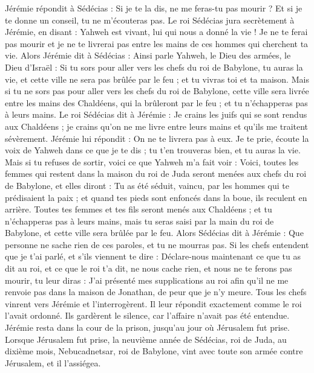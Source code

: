 \begin{multicols}{2}
Jérémie répondit à Sédécias : Si je te la dis, ne me feras-tu pas mourir ? Et si je te donne un conseil, tu ne m'écouteras pas.
Le roi Sédécias jura secrètement à Jérémie, en disant : Yahweh est vivant, lui qui nous a donné la vie ! Je ne te ferai pas mourir et je ne te livrerai pas entre les mains de ces hommes qui cherchent ta vie.
Alors Jérémie dit à Sédécias : Ainsi parle Yahweh, le Dieu des armées, le Dieu d'Israël : Si tu sors pour aller vers les chefs du roi de Babylone, tu auras la vie, et cette ville ne sera pas brûlée par le feu ; et tu vivras toi et ta maison.
Mais si tu ne sors pas pour aller vers les chefs du roi de Babylone, cette ville sera livrée entre les mains des Chaldéens, qui la brûleront par le feu ; et tu n'échapperas pas à leurs mains.
Le roi Sédécias dit à Jérémie : Je crains les juifs qui se sont rendus aux Chaldéens ; je crains qu'on ne me livre entre leurs mains et qu'ils me traitent sévèrement.
Jérémie lui répondit : On ne te livrera pas à eux. Je te prie, écoute la voix de Yahweh dans ce que je te dis ; tu t'en trouveras bien, et tu auras la vie.
Mais si tu refuses de sortir, voici ce que Yahweh m'a fait voir :
Voici, toutes les femmes qui restent dans la maison du roi de Juda seront menées aux chefs du roi de Babylone, et elles diront : Tu as été séduit, vaincu, par les hommes qui te prédisaient la paix ; et quand tes pieds sont enfoncés dans la boue, ils reculent en arrière.
Toutes tes femmes et tes fils seront menés aux Chaldéens ; et tu n'échapperas pas à leurs mains, mais tu seras saisi par la main du roi de Babylone, et cette ville sera brûlée par le feu.
Alors Sédécias dit à Jérémie : Que personne ne sache rien de ces paroles, et tu ne mourras pas.
Si les chefs entendent que je t'ai parlé, et s'ils viennent te dire : Déclare-nous maintenant ce que tu as dit au roi, et ce que le roi t'a dit, ne nous cache rien, et nous ne te ferons pas mourir,
tu leur diras : J'ai présenté mes supplications au roi afin qu'il ne me renvoie pas dans la maison de Jonathan, de peur que je n'y meure.
Tous les chefs vinrent vers Jérémie et l'interrogèrent. Il leur répondit exactement comme le roi l'avait ordonné. Ils gardèrent le silence, car l'affaire n'avait pas été entendue.
Jérémie resta dans la cour de la prison, jusqu'au jour où Jérusalem fut prise.
\VerseOne{}Lorsque Jérusalem fut prise, la neuvième année de Sédécias, roi de Juda, au dixième mois, Nebucadnetsar, roi de Babylone, vint avec toute son armée contre Jérusalem, et il l'assiégea.

\end{multicols}
